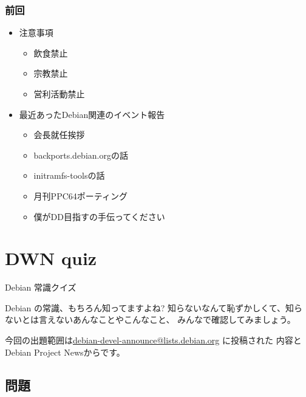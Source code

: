 \begin{frame}
 \frametitle{前回}
\begin{minipage}[t]{0.45\hsize}
  \begin{itemize}
  \item 注意事項
	\begin{itemize}
	 \item 飲食禁止
	 \item 宗教禁止
	 \item 営利活動禁止
	\end{itemize}
  \end{itemize}
\end{minipage}
\begin{minipage}[t]{0.45\hsize}
\begin{itemize}
  \item 最近あったDebian関連のイベント報告
 \begin{itemize}
  \item 会長就任挨拶
  \item backports.debian.orgの話
  \item initramfs-toolsの話
  \item 月刊PPC64ポーティング
  \item 僕がDD目指すの手伝ってください
 \end{itemize}
 \end{itemize}
\end{minipage}
\end{frame}




\section{DWN quiz}
\begin{frame}{Debian 常識クイズ}

Debian の常識、もちろん知ってますよね?
知らないなんて恥ずかしくて、知らないとは言えないあんなことやこんなこと、
みんなで確認してみましょう。

今回の出題範囲は\url{debian-devel-announce@lists.debian.org} に投稿された
内容とDebian Project Newsからです。

\end{frame}

\subsection{問題}


